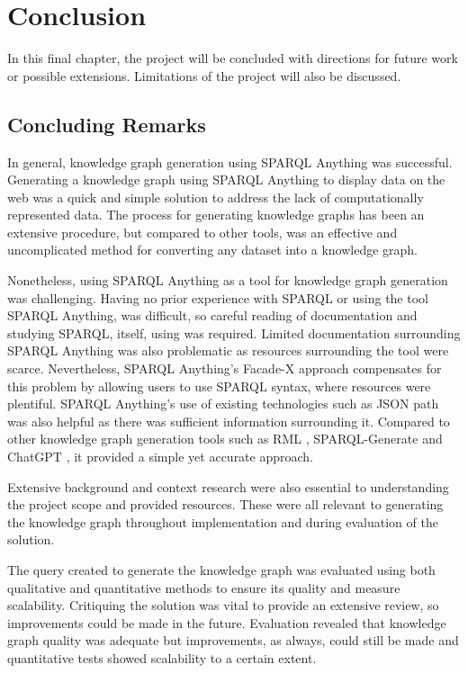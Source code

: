 \chapter{Conclusion}
In this final chapter, the project will be concluded with directions for future work or possible extensions. Limitations of the project will also be discussed. 

\section{Concluding Remarks}
\hspace{0.5cm} In general, knowledge graph generation using SPARQL Anything was successful. Generating a knowledge graph using SPARQL Anything to display data on the web was a quick and simple solution to address the lack of computationally represented data. The process for generating knowledge graphs has been an extensive procedure, but compared to other tools, was an effective and uncomplicated method for converting any dataset into a knowledge graph. 

Nonetheless, using SPARQL Anything as a tool for knowledge graph generation was challenging. Having no prior experience with SPARQL or using the tool SPARQL Anything, was difficult, so careful reading of documentation \cite{sparqlanythinggithub} and studying SPARQL, itself, using \cite{sparlbook} was required. Limited documentation surrounding SPARQL Anything was also problematic as resources surrounding the tool were scarce. Nevertheless, SPARQL Anything's Facade-X approach compensates for this problem by allowing users to use SPARQL syntax, where resources were plentiful. SPARQL Anything's use of existing technologies such as JSON path was also helpful as there was sufficient information surrounding it. Compared to other knowledge graph generation tools such as RML \cite{rml}, SPARQL-Generate \cite{sparqlgenerate} and ChatGPT \cite{chatgptwebsite}, it provided a simple yet accurate approach. 

Extensive background and context research were also essential to understanding the project scope and provided resources. These were all relevant to generating the knowledge graph throughout implementation and during evaluation of the solution. 

The query created to generate the knowledge graph was evaluated using both qualitative and quantitative methods to ensure its quality and measure scalability. Critiquing the solution was vital to provide an extensive review, so improvements could be made in the future. Evaluation revealed that knowledge graph quality was adequate but improvements, as always, could still be made and quantitative tests showed scalability to a certain extent. 

